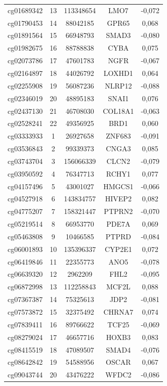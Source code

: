 \documentclass[12pt,a4paper]{article}
\begin{document}
\begin{longtable}{|c|c|c|c|c|}
		cg01689342 & 13 & 113348654 & LMO7 & -0,072 \\
		cg01790453 & 14 & 88042185 & GPR65 & 0,068 \\
		cg01891564 & 15 & 66948793 & SMAD3 & -0,080 \\
		cg01982675 & 16 & 88788838 & CYBA & 0,075 \\
		cg02073786 & 17 & 47601783 & NGFR & -0,067 \\
		cg02164897 & 18 & 44026792 & LOXHD1 & 0,064 \\
		cg02255908 & 19 & 56087236 & NLRP12 & -0,088 \\
		cg02346019 & 20 & 48895183 & SNAI1 & 0,076 \\
		cg02437130 & 21 & 46708030 & COL18A1 & -0,063 \\
		cg02528241 & 22 & 49356925 & BRD1 & 0,060 \\
		cg03333933 & 1 & 26927658 & ZNF683 & -0,091 \\
		cg03536843 & 2 & 99339373 & CNGA3 & 0,085 \\
		cg03743704 & 3 & 156066339 & CLCN2 & -0,079 \\
		cg03950592 & 4 & 76347713 & RCHY1 & 0,077 \\
		cg04157496 & 5 & 43001027 & HMGCS1 & -0,066 \\
		cg04527918 & 6 & 143834757 & HIVEP2 & 0,082 \\
		cg04775207 & 7 & 158321447 & PTPRN2 & -0,070 \\
		cg05219514 & 8 & 66953770 & PDE7A & 0,069 \\
		cg05463808 & 9 & 10466585 & PTPRD & -0,084 \\
		cg06001893 & 10 & 135396337 & CYP2E1 & 0,072 \\
		cg06419846 & 11 & 22355773 & ANO5 & -0,078 \\
		cg06639320 & 12 & 2962209 & FHL2 & -0,095 \\
		cg06872998 & 13 & 112258843 & MCF2L & 0,088 \\
		cg07367387 & 14 & 75325613 & JDP2 & -0,081 \\
		cg07573872 & 15 & 32375492 & CHRNA7 & 0,074 \\
		cg07839411 & 16 & 89766622 & TCF25 & -0,069 \\
		cg08279024 & 17 & 46657716 & HOXB3 & 0,083 \\
		cg08415519 & 18 & 47089507 & SMAD4 & -0,076 \\
		cg08642842 & 19 & 54588956 & OSCAR & 0,067 \\
		cg09043744 & 20 & 43476222 & WFDC2 & -0,086 \\

\end{longtable}
\end{document}
